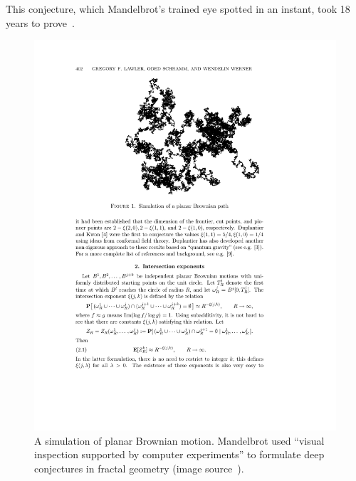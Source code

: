 \documentclass{llncs}
\begin{document}
This conjecture, which  Mandelbrot's trained eye spotted in an instant,
took 18 years to prove~\cite{LSW01}.



\begin{figure}[h!]
  \centering
\includegraphics[scale=0.5]{brownian_motion.pdf}
  \caption{A simulation of planar Brownian motion. Mandelbrot used ``visual
inspection supported by computer experiments'' to formulate deep
conjectures in fractal geometry (image source~\cite{LSW01}).}
\label{fig:4/3}
\end{figure}

\end{document}
